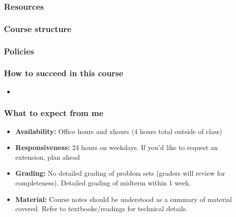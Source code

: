 \documentclass[serif,mathserif]{beamer}
\begin{document}
\begin{frame} 
\frametitle{Resources}

\end{frame}

\begin{frame}
\frametitle{Course structure}


\end{frame}

\begin{frame}
\frametitle{Policies}


\end{frame}

\begin{frame} 
\frametitle{How to succeed in this course}
\begin{itemize}
\item 
\end{itemize}

\end{frame}

\begin{frame} 
\frametitle{What to expect from me}

\begin{itemize}
\item {\bf Availability:} Office hours and xhours (4 hours total outside of class)
\item {\bf Responsiveness:} 24 hours on weekdays. If you'd like to request an extension, plan ahead
\item {\bf Grading:} No detailed grading of problem sets (graders will review for completeness). Detailed grading of midterm within 1 week. 
\item {\bf Material:} Course notes should be understood as a summary of material covered. Refer to textbooks/readings for technical details. 
\end{itemize}

\end{frame}
\end{document}

